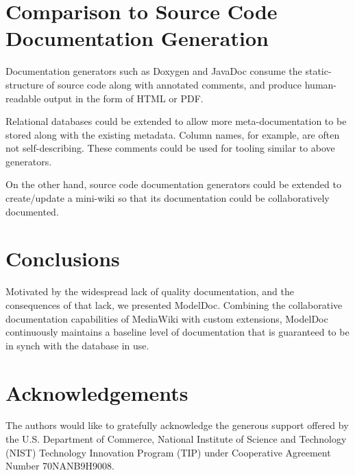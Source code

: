 \documentclass[nocopyrightspace]{acm_proc_article-sp}
\begin{document}
\section{Comparison to Source Code Documentation Generation}

Documentation generators such as Doxygen \cite{web:doxygen} and JavaDoc
\cite{web:javadoc} consume the static-structure of source code along with
annotated comments, and produce human-readable output in the form of HTML or
PDF.

Relational databases could be extended to allow more meta-documentation to be
stored along with the existing metadata.  Column names, for example, are often
not self-describing.  These comments could be used for tooling similar to above
generators.

On the other hand, source code documentation generators could be extended to
create/update a mini-wiki so that its documentation could be collaboratively
documented.

\section{Conclusions}
Motivated by the widespread lack of quality documentation, and the consequences
of that lack, we presented ModelDoc.  Combining the collaborative documentation
capabilities of MediaWiki with custom extensions, ModelDoc continuously
maintains a baseline level of documentation that is guaranteed to be in synch
with the database in use.

\section{Acknowledgements}
The authors would like to gratefully acknowledge the generous support offered by the U.S. Department of Commerce, 
National Institute of Science and Technology (NIST) Technology Innovation Program (TIP) under Cooperative Agreement Number 70NANB9H9008.



\balancecolumns
\end{document}
